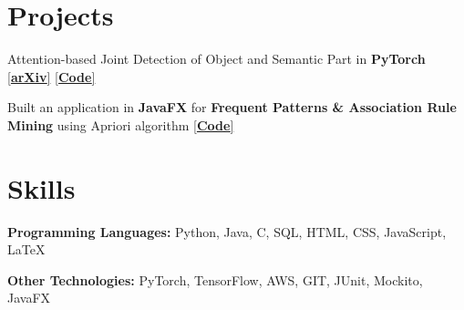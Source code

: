 \documentclass[]{Keval-resume}
\begin{document}
\section{Projects}
\hrulefill
\postsectionsep

\textbullet{} Attention-based Joint Detection of Object and Semantic Part in \textbf{PyTorch} \href{https://arxiv.org/abs/2007.02419}{[\textbf{arXiv}]} \href{https://github.com/kevalmorabia97/Object-and-Semantic-Part-Detection-pyTorch}{[\textbf{Code}]}

\textbullet{} Built an application in \textbf{JavaFX} for \textbf{Frequent Patterns \& Association Rule Mining} using Apriori algorithm \href{https://github.com/kevalmorabia97/FPARM-Frequent-Patterns-and-Association-Rule-Miner}{[\textbf{Code}]}






\sectionsep

\section{Skills} 
\hrulefill
\postsectionsep

\textbullet{} \textbf{Programming Languages:} Python, Java, C, SQL, HTML, CSS, JavaScript, LaTeX

\textbullet{} \textbf{Other Technologies:} PyTorch, TensorFlow, AWS, GIT, JUnit, Mockito, JavaFX

\sectionsep

\end{document}
